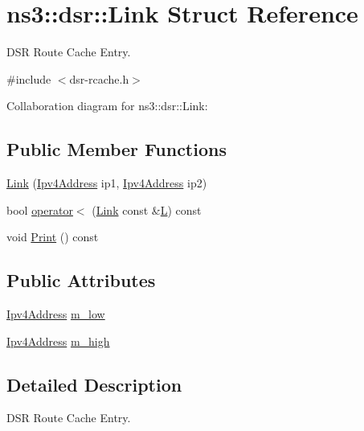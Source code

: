 \hypertarget{structns3_1_1dsr_1_1Link}{}\section{ns3\+:\+:dsr\+:\+:Link Struct Reference}
\label{structns3_1_1dsr_1_1Link}


D\+SR Route Cache Entry.  




{\ttfamily \#include $<$dsr-\/rcache.\+h$>$}



Collaboration diagram for ns3\+:\+:dsr\+:\+:Link\+:
\subsection*{Public Member Functions}
\begin{DoxyCompactItemize}
\item 
\hyperlink{structns3_1_1dsr_1_1Link_a800f448120e34f9da88e12d5e49a0b02}{Link} (\hyperlink{classns3_1_1Ipv4Address}{Ipv4\+Address} ip1, \hyperlink{classns3_1_1Ipv4Address}{Ipv4\+Address} ip2)
\item 
bool \hyperlink{structns3_1_1dsr_1_1Link_a3ef118780ceef8758b81faf4e9a411c4}{operator$<$} (\hyperlink{structns3_1_1dsr_1_1Link}{Link} const \&\hyperlink{loss__ITU1411__NLOS__over__rooftop_8m_a0f93e2c2e7c447b4dfc5bcac7e346da1}{L}) const 
\item 
void \hyperlink{structns3_1_1dsr_1_1Link_ac42e8f24b144070c22574627bf166e02}{Print} () const 
\end{DoxyCompactItemize}
\subsection*{Public Attributes}
\begin{DoxyCompactItemize}
\item 
\hyperlink{classns3_1_1Ipv4Address}{Ipv4\+Address} \hyperlink{structns3_1_1dsr_1_1Link_a57d7fa6b91edee2a0c5b2889f329cbba}{m\+\_\+low}
\item 
\hyperlink{classns3_1_1Ipv4Address}{Ipv4\+Address} \hyperlink{structns3_1_1dsr_1_1Link_a96ef932631eeeb9060b6a55e29362dad}{m\+\_\+high}
\end{DoxyCompactItemize}


\subsection{Detailed Description}
D\+SR Route Cache Entry. 

